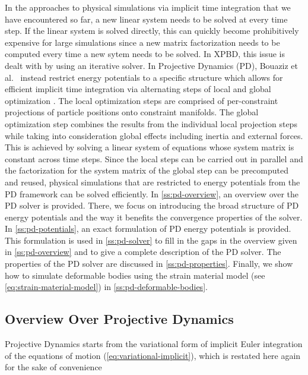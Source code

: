 In the approaches to physical simulations via implicit time integration that we have encountered so far, a new linear system needs to be solved
at every time step. If the linear system is solved directly, this can quickly become prohibitively expensive for large simulations since 
a new matrix factorization needs to be computed every time a new sytem needs to be solved. In XPBD, this issue is dealt with by using an iterative 
solver. In Projective Dynamics (PD), Bouaziz et al.\ \cite{bouaziz2014} instead restrict energy potentials to a specific structure 
which allows for efficient implicit time integration via alternating steps of local and global optimization \cite{bouaziz2014}. The local 
optimization steps are comprised of per-constraint projections of particle positions onto constraint manifolds. The global optimization 
step combines the results from the individual 
local projection steps while taking into consideration global effects including inertia and external forces. This is achieved by solving a 
linear system of equations whose system matrix is constant across time steps. Since the local steps can be carried out in parallel and the 
factorization for the system matrix of the global step can be precomputed and reused, physical simulations that are restricted to energy 
potentials from the PD framework can be solved efficiently. In \autoref{ss:pd-overview}, an overview over the PD solver is provided. There, 
we focus on introducing the broad structure of PD energy potentials and the way it benefits the convergence properties of the solver. In 
\autoref{ss:pd-potentials}, an exact formulation of PD energy potentials is provided. This formulation is used in \autoref{ss:pd-solver} 
to fill in the gaps in the overview given in \autoref{ss:pd-overview} and to give a complete description of the PD solver. The 
properties of the PD solver are discussed in \autoref{ss:pd-properties}. Finally, we show how to simulate deformable bodies using the strain 
material model (see \cref{eq:strain-material-model}) in \autoref{ss:pd-deformable-bodies}.

\subsection{Overview Over Projective Dynamics}\label{ss:pd-overview}
Projective Dynamics starts from the variational form of implicit Euler integration of the equations of motion (\cref{eq:variational-implicit}),
which is restated here again for the sake of convenience

